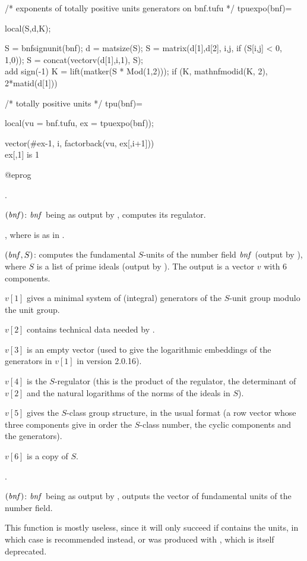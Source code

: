 \bprog
/* exponents of totally positive units generators on bnf.tufu */
tpuexpo(bnf)=
{ local(S,d,K);

  S = bnfsignunit(bnf); d = matsize(S);
  S = matrix(d[1],d[2], i,j, if (S[i,j] < 0, 1,0));
  S = concat(vectorv(d[1],i,1), S);   \\ add sign(-1)
  K = lift(matker(S * Mod(1,2)));
  if (K, mathnfmodid(K, 2), 2*matid(d[1]))
}

/* totally positive units */
tpu(bnf)=
{ local(vu = bnf.tufu, ex = tpuexpo(bnf));

  vector(#ex-1, i, factorback(vu, ex[,i+1]))  \\ ex[,1] is 1
}
@eprog

.

$(\hbox{\it bnf\/})$: $\hbox{\it bnf\/}$ being as output by
, computes its regulator.

, where  is as in
.

$(\hbox{\it bnf\/},S)$: computes the fundamental $S$-units of the
number field $\hbox{\it bnf\/}$ (output by ), where $S$ is a list of
prime ideals (output by ). The output is a vector $v$ with
6 components.

$v[1]$ gives a minimal system of (integral) generators of the $S$-unit group
modulo the unit group.

$v[2]$ contains technical data needed by .

$v[3]$ is an empty vector (used to give the logarithmic embeddings of the
generators in $v[1]$ in version 2.0.16).

$v[4]$ is the $S$-regulator (this is the product of the regulator, the
determinant of $v[2]$ and the natural logarithms of the norms of the ideals
in $S$).

$v[5]$ gives the $S$-class group structure, in the usual format
(a row vector whose three components give in order the $S$-class number,
the cyclic components and the generators).

$v[6]$ is a copy of $S$.

.

$(\hbox{\it bnf\/})$: $\hbox{\it bnf\/}$ being as output by
, outputs the vector of fundamental units of the number field.

This function is mostly useless, since it will only succeed if
 contains the units, in which case  is recommended
instead, or  was produced with , which is itself
deprecated.

